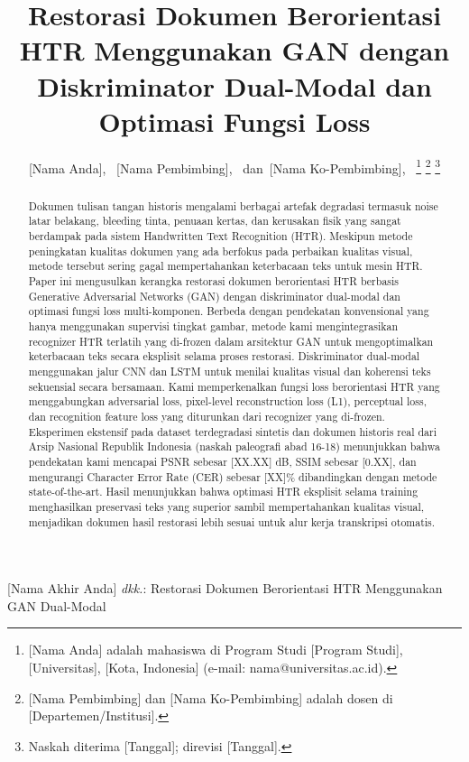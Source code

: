 \documentclass[journal]{IEEEtran}
\begin{document}
%
\title{Restorasi Dokumen Berorientasi HTR Menggunakan GAN dengan Diskriminator Dual-Modal dan Optimasi Fungsi Loss}
%
\author{[Nama Anda],~
        [Nama Pembimbing],~
        dan~[Nama Ko-Pembimbing],~%
\thanks{[Nama Anda] adalah mahasiswa di Program Studi [Program Studi], [Universitas], [Kota, Indonesia] (e-mail: nama@universitas.ac.id).}%
\thanks{[Nama Pembimbing] dan [Nama Ko-Pembimbing] adalah dosen di [Departemen/Institusi].}%
\thanks{Naskah diterima [Tanggal]; direvisi [Tanggal].}}

%
{[Nama Akhir Anda] \MakeLowercase{\textit{dkk.}}: Restorasi Dokumen Berorientasi HTR Menggunakan GAN Dual-Modal}

\maketitle

\begin{abstract}
Dokumen tulisan tangan historis mengalami berbagai artefak degradasi termasuk noise latar belakang, bleeding tinta, penuaan kertas, dan kerusakan fisik yang sangat berdampak pada sistem Handwritten Text Recognition (HTR). Meskipun metode peningkatan kualitas dokumen yang ada berfokus pada perbaikan kualitas visual, metode tersebut sering gagal mempertahankan keterbacaan teks untuk mesin HTR. Paper ini mengusulkan kerangka restorasi dokumen berorientasi HTR berbasis Generative Adversarial Networks (GAN) dengan diskriminator dual-modal dan optimasi fungsi loss multi-komponen. Berbeda dengan pendekatan konvensional yang hanya menggunakan supervisi tingkat gambar, metode kami mengintegrasikan recognizer HTR terlatih yang di-frozen dalam arsitektur GAN untuk mengoptimalkan keterbacaan teks secara eksplisit selama proses restorasi. Diskriminator dual-modal menggunakan jalur CNN dan LSTM untuk menilai kualitas visual dan koherensi teks sekuensial secara bersamaan. Kami memperkenalkan fungsi loss berorientasi HTR yang menggabungkan adversarial loss, pixel-level reconstruction loss (L1), perceptual loss, dan recognition feature loss yang diturunkan dari recognizer yang di-frozen. Eksperimen ekstensif pada dataset terdegradasi sintetis dan dokumen historis real dari Arsip Nasional Republik Indonesia (naskah paleografi abad 16-18) menunjukkan bahwa pendekatan kami mencapai PSNR sebesar [XX.XX] dB, SSIM sebesar [0.XX], dan mengurangi Character Error Rate (CER) sebesar [XX]\% dibandingkan dengan metode state-of-the-art. Hasil menunjukkan bahwa optimasi HTR eksplisit selama training menghasilkan preservasi teks yang superior sambil mempertahankan kualitas visual, menjadikan dokumen hasil restorasi lebih sesuai untuk alur kerja transkripsi otomatis.
\end{abstract}
\end{document}

